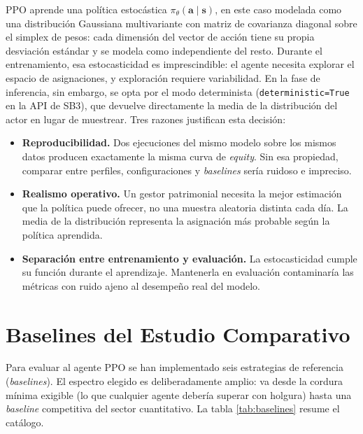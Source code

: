\documentclass[IB,a4paper]{TFUOC}
\begin{document}
PPO aprende una política estocástica $\pi_{\theta}(\mathbf{a} \mid \mathbf{s})$, en este caso modelada como una distribución Gaussiana multivariante con matriz de covarianza diagonal sobre el simplex de pesos: cada dimensión del vector de acción tiene su propia desviación estándar y se modela como independiente del resto. Durante el entrenamiento, esa estocasticidad es imprescindible: el agente necesita explorar el espacio de asignaciones, y exploración requiere variabilidad. En la fase de inferencia, sin embargo, se opta por el modo determinista (\texttt{deterministic=True} en la API de SB3), que devuelve directamente la media de la distribución del actor en lugar de muestrear. Tres razones justifican esta decisión:

\begin{itemize}
    \item \textbf{Reproducibilidad.} Dos ejecuciones del mismo modelo sobre los mismos datos producen exactamente la misma curva de \textit{equity}. Sin esa propiedad, comparar entre perfiles, configuraciones y \textit{baselines} sería ruidoso e impreciso.
    \item \textbf{Realismo operativo.} Un gestor patrimonial necesita la mejor estimación que la política puede ofrecer, no una muestra aleatoria distinta cada día. La media de la distribución representa la asignación más probable según la política aprendida.
    \item \textbf{Separación entre entrenamiento y evaluación.} La estocasticidad cumple su función durante el aprendizaje. Mantenerla en evaluación contaminaría las métricas con ruido ajeno al desempeño real del modelo.
\end{itemize}

\section{Baselines del Estudio Comparativo}
\label{sec:baselines}

Para evaluar al agente PPO se han implementado seis estrategias de referencia (\textit{baselines}). El espectro elegido es deliberadamente amplio: va desde la cordura mínima exigible (lo que cualquier agente debería superar con holgura) hasta una \textit{baseline} competitiva del sector cuantitativo. La tabla \ref{tab:baselines} resume el catálogo.
\end{document}
